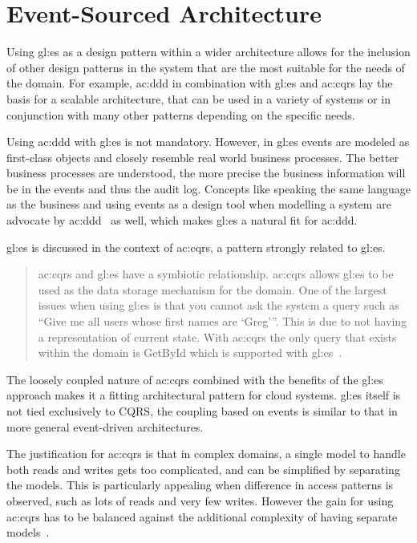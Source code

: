 \section{Event-Sourced Architecture}\label{sec:esa}

Using \gls{gl:es} as a design pattern within a wider architecture allows for the inclusion of other design patterns in the system that are the most suitable for the needs of the domain. For example, \gls{ac:ddd} in combination with \gls{gl:es} and \gls{ac:cqrs} lay the basis for a scalable architecture, that can be used in a variety of systems or in conjunction with many other patterns depending on the specific needs.


Using \gls{ac:ddd} with \gls{gl:es} is not mandatory. However, in \gls{gl:es} events are modeled as first-class objects and closely resemble real world business processes. The better business processes are understood, the more precise the business information will be in the events and thus the audit log. Concepts like speaking the same language as the business and using events as a design tool when modelling a system are advocate by \gls{ac:ddd}~\citep{evans2004domain} as well, which makes \gls{gl:es} a natural fit for \gls{ac:ddd}.


\gls{gl:es} is discussed in the context of \gls{ac:cqrs}, a pattern strongly related to \gls{gl:es}.

\begin{quote}
\gls{ac:cqrs} and \gls{gl:es} have a symbiotic relationship. \gls{ac:cqrs} allows \gls{gl:es} to be used as the
data storage mechanism for the domain. One of the largest issues when using \gls{gl:es} is that you
cannot ask the system a query such as “Give me all users whose first names are ‘Greg’”. This is due to
not having a representation of current state. With \gls{ac:cqrs} the only query that exists within the domain is
GetById which is supported with \gls{gl:es}~\citep{young2010cqrs}.
\end{quote}

The loosely coupled nature of \gls{ac:cqrs} combined with the benefits of the \gls{gl:es} approach makes it a fitting architectural pattern for cloud systems. \gls{gl:es} itself is not tied exclusively to CQRS, the coupling based on events is similar to that in more general event-driven architectures.

The justification for \gls{ac:cqrs} is that in complex domains, a single model to handle both reads and writes gets too complicated, and can be simplified by separating the models. This is particularly appealing when difference in access patterns is observed, such as lots of reads and very few writes. However the gain for using \gls{ac:cqrs} has to be balanced against the additional complexity of having separate models~\citep{esvsed}.

